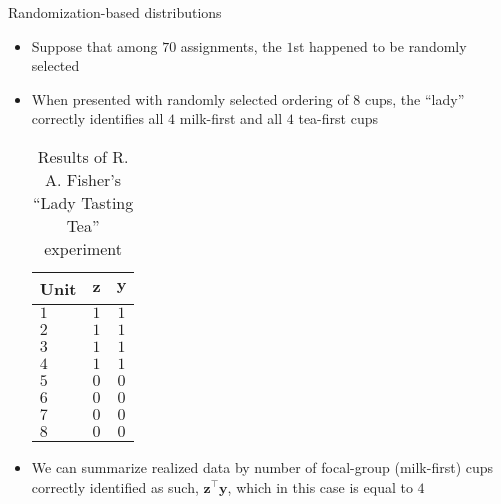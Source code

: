 \documentclass[table, xcolor = {dvipsnames}, 9pt]{beamer}
\theoremstyle{plain}
\begin{document}
\begin{frame}{Randomization-based distributions}
\vfill
\begin{itemize}
\item Suppose that among $70$ assignments, the $1$st happened to be randomly selected \vfill
\item When presented with randomly selected ordering of $8$ cups, the ``lady'' correctly identifies all $4$ milk-first and all $4$ tea-first cups \vfill
\vspace{1em}
\begin{table}[H]
\centering
\begin{tabular}{l|cc}
\toprule
Unit & $\bm{z}$ & $\bm{y}$ \\ 
  \midrule
$1$ & $1$ & $1$  \\ 
$2$ & $1$ & $1$  \\ 
$3$ & $1$ & $1$  \\ 
$4$ & $1$ & $1$  \\ 
$5$ & $0$ & $0$  \\ 
$6$ & $0$ & $0$  \\ 
$7$ & $0$ & $0$ \\ 
$8$ & $0$ & $0$ 
\end{tabular}
\caption{Results of R. A. Fisher's ``Lady Tasting Tea'' experiment}
\label{tab: lady tasting tea obs data}
\end{table}
\vspace{-2em}
\vfill
\item We can summarize realized data by number of focal-group (milk-first) cups correctly identified as such, $\mathbf{z}^{\top}\mathbf{y}$, which in this case is equal to $4$ \vfill
\end{itemize}
\end{frame}
\end{document}
